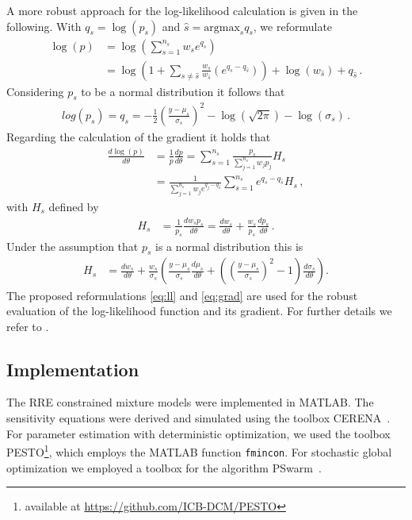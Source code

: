 \documentclass{llncs}
\newcommand{\argmax}{\mathrm{argmax}}
\begin{document}
A more robust approach for the log-likelihood calculation is given in the following. With $q_s = \log(p_s)$ and $\hat{s} = \argmax_{s}{q_s}$, we reformulate
\begin{align}
\log(p) &= \log\left(\sum_{s=1}^{n_s} w_s e^{q_s} \right)\nonumber \\ 
 &= \log\left(1+ \sum_{s\neq \hat{s}} \frac{w_s}{w_{\hat{s}}}\left(e^{q_s - q_{\hat{s}}}\right)\right) + \log(w_{\hat{s}}) + q_{\hat{s}}\,.\label{eq:ll}
\end{align}
Considering $p_s$ to be a normal distribution it follows that
\begin{align*}
log(p_s) = q_s = -\frac{1}{2}\left(\frac{y-\mu_s}{\sigma_s}\right)^2 - \log(\sqrt{2\pi}) - \log(\sigma_s)\,.
\end{align*}
Regarding the calculation of the gradient it holds that
\begin{align}
\frac{d\log(p)}{d \theta} &= \frac{1}{p}\frac{dp}{d\theta} = \sum_{s=1}^{n_s}\frac{p_s}{\sum_{j=1}^{n_s}w_jp_j} H_s \nonumber\\
&= \frac{1}{\sum_{j=1}^{n_s}w_je^{q_j-q_{\hat{s}}}}\sum_{s=1}^{n_s} e^{q_s-q_{\hat{s}}}H_s\,,\label{eq:grad}
\end{align}
with $H_s$ defined by
\begin{align*}
H_s  &= \frac{1}{p_s}\frac{d w_sp_s}{d\theta} = \frac{dw_s}{d\theta}+ \frac{w_s}{p_s}\frac{d p_s}{d\theta}\,.
\end{align*}
Under the assumption that $p_s$ is a normal distribution this is
\begin{align*}
H_s &= \frac{dw_s}{d\theta } + \frac{w_s}{\sigma_s}\left(\frac{y-\mu_s}{\sigma_s}\frac{d\mu_s}{d\theta} + \left(\left(\frac{y-\mu_s}{\sigma_s}\right)^2-1\right)\frac{d\sigma_s}{d\theta}\right).
\end{align*}
The proposed reformulations \eqref{eq:ll} and \eqref{eq:grad} are used for the robust evaluation of the log-likelihood function and its gradient. For further details we refer to \cite{Loos2016}.

\subsection{Implementation}
The RRE constrained mixture models were implemented in MATLAB. The sensitivity equations were derived and simulated using the toolbox CERENA~\cite{CERENA}. For parameter estimation with deterministic optimization, we used the toolbox PESTO\footnote{available at \url{https://github.com/ICB-DCM/PESTO}}, which employs the MATLAB function \texttt{fmincon}. For stochastic global optimization we employed a toolbox for the algorithm PSwarm~\cite{Vaz2006}. 
\end{document}
